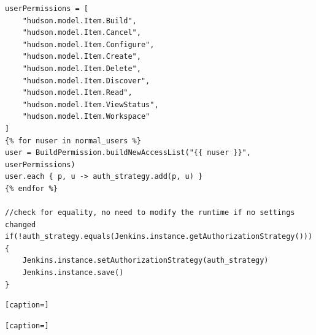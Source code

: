 \documentclass[10pt,letterpaper,onecolumn,draftclsnofoot]{IEEEtran}
\begin{document}
\begin{lstlisting}[caption=Template for configuring authentication]
userPermissions = [
	"hudson.model.Item.Build",
	"hudson.model.Item.Cancel",
	"hudson.model.Item.Configure",
	"hudson.model.Item.Create",
	"hudson.model.Item.Delete",
	"hudson.model.Item.Discover",
	"hudson.model.Item.Read",
	"hudson.model.Item.ViewStatus",
	"hudson.model.Item.Workspace"
]
{% for nuser in normal_users %}
user = BuildPermission.buildNewAccessList("{{ nuser }}", userPermissions)
user.each { p, u -> auth_strategy.add(p, u) }
{% endfor %}

//check for equality, no need to modify the runtime if no settings changed
if(!auth_strategy.equals(Jenkins.instance.getAuthorizationStrategy())) {
    Jenkins.instance.setAuthorizationStrategy(auth_strategy)
    Jenkins.instance.save()
}
\end{lstlisting}

\begin{lstlisting}[caption=]

\end{lstlisting}

\begin{lstlisting}[caption=]

\end{lstlisting}
\end{document}
